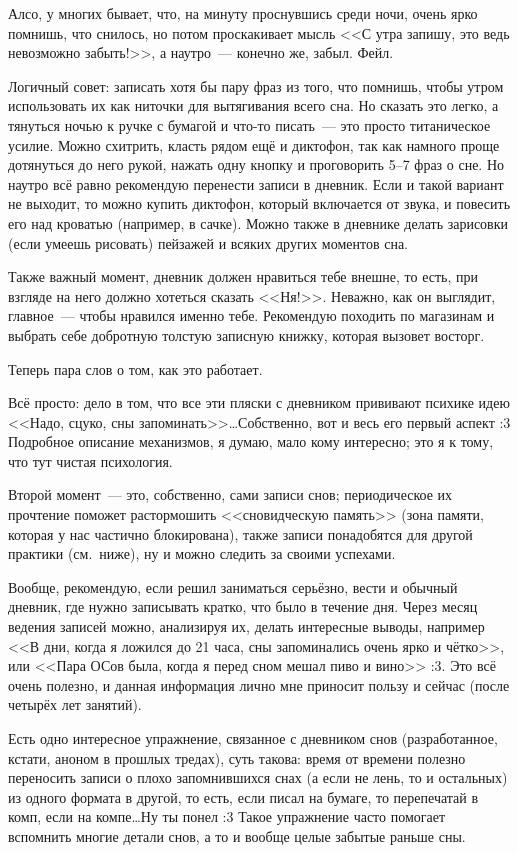 \documentclass[a5paper,12pt,twoside]{memoir}
\begin{document}
Алсо, у многих бывает, что, на минуту проснувшись среди ночи, очень ярко помнишь, что снилось, но потом проскакивает мысль <<С утра запишу, это ведь невозможно забыть!>>, а наутро~--- конечно же, забыл. Фейл.

Логичный совет: записать хотя бы пару фраз из того, что помнишь, чтобы утром использовать их как ниточки для вытягивания всего сна. Но сказать это легко, а тянуться ночью к ручке с бумагой и что-то писать~--- это просто титаническое усилие. Можно схитрить, класть рядом ещё и диктофон, так как намного проще дотянуться до него рукой, нажать одну кнопку и проговорить 5--7 фраз о сне. Но наутро всё равно рекомендую перенести записи в дневник. Если и такой вариант не выходит, то можно купить диктофон, который включается от звука, и повесить его над кроватью (например, в сачке). Можно также в дневнике делать зарисовки (если умеешь рисовать) пейзажей и всяких других моментов сна.

Также важный момент, дневник должен нравиться тебе внешне, то есть, при взгляде на него должно хотеться сказать <<Ня!>>. Неважно, как он выглядит, главное~--- чтобы нравился именно тебе. Рекомендую походить по магазинам и выбрать себе добротную толстую записную книжку, которая вызовет восторг.

Теперь пара слов о том, как это работает.

Всё просто: дело в том, что все эти пляски с дневником прививают психике идею <<Надо, сцуко, сны запоминать>>\ldots Собственно, вот и весь его первый аспект :3 Подробное описание механизмов, я думаю, мало кому интересно; это я к тому, что тут чистая психология.

Второй момент~--- это, собственно, сами записи снов; периодическое их прочтение поможет растормошить <<сновидческую память>> (зона памяти, которая у нас частично блокирована), также записи понадобятся для другой практики (см.~ниже), ну и можно следить за своими успехами.

Вообще, рекомендую, если решил заниматься серьёзно, вести и обычный дневник, где нужно записывать кратко, что было в течение дня. Через месяц ведения записей можно, анализируя их, делать интересные выводы, например <<В дни, когда я ложился до 21 часа, сны запоминались очень ярко и чётко>>, или <<Пара ОСов была, когда я перед сном мешал пиво и вино>> :3. Это всё очень полезно, и данная информация лично мне приносит пользу и сейчас (после четырёх лет занятий).

Есть одно интересное упражнение, связанное с дневником снов (разработанное, кстати, аноном в прошлых тредах), суть такова: время от времени полезно переносить записи о плохо запомнившихся снах (а если не лень, то и остальных) из одного формата в другой, то есть, если писал на бумаге, то перепечатай в комп, если на компе\ldots Ну ты понел :3 Такое упражнение часто помогает вспомнить многие детали снов, а то и вообще целые забытые раньше сны.
 
\end{document}
